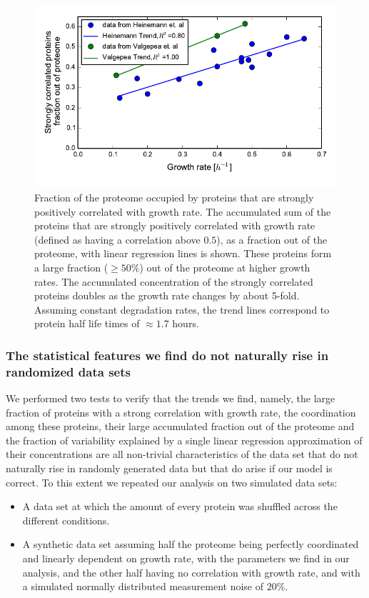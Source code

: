 \documentclass[a4paper]{article}
\begin{document}
\begin{figure}[H]
\begin{center}
\includegraphics[width=1\columnwidth]{GlobalClusterGRFit.pdf}
\caption{\label{fig:globalgrcorr}
Fraction of the proteome occupied by proteins that are strongly positively correlated with growth rate.
The accumulated sum of the proteins that are strongly positively correlated with growth rate (defined as having a correlation above $0.5$), as a fraction out of the proteome, with linear regression lines is shown.
These proteins form a large fraction ($\ge 50\%$) out of the proteome at higher growth rates.
The accumulated concentration of the strongly correlated proteins doubles as the growth rate changes by about 5-fold.
Assuming constant degradation rates, the trend lines correspond to protein half life times of $\approx 1.7$ hours.
}
\end{center}
\end{figure}

\subsubsection{The statistical features we find do not naturally rise in randomized data sets}
We performed two tests to verify that the trends we find, namely, the large fraction of proteins with a strong correlation with growth rate, the coordination among these proteins, their large accumulated fraction out of the proteome and the fraction of variability explained by a single linear regression approximation of their concentrations are all non-trivial characteristics of the data set that do not naturally rise in randomly generated data but that do arise if our model is correct.
To this extent we repeated our analysis on two simulated data sets:
\begin{itemize}
\item A data set at which the amount of every protein was shuffled across the different conditions.
\item A synthetic data set assuming half the proteome being perfectly coordinated and linearly dependent on growth rate, with the parameters we find in our analysis, and the other half having no correlation with growth rate, and with a simulated normally distributed measurement noise of $20\%$.
\end{itemize}
\end{document}
